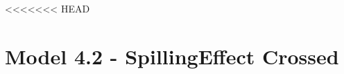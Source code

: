 \documentclass[]{report}
\begin{document}


<<<<<<< HEAD
\chapter{Model 4.2 - SpillingEffect Crossed}
\end{document}

